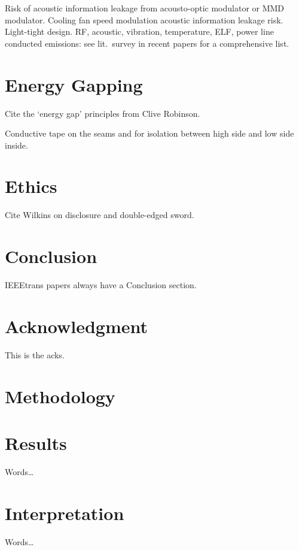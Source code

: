 \documentclass[conference]{IEEEtran}
\begin{document}
Risk of acoustic information leakage from acousto-optic modulator or MMD
modulator. Cooling fan speed modulation acoustic information leakage risk.
Light-tight design. RF, acoustic, vibration, temperature, ELF, power line
conducted emissions: see lit.\ survey in recent papers for a comprehensive
list.

\section{Energy Gapping}

Cite the `energy gap' principles from Clive Robinson.

Conductive tape on the seams and for isolation between high side and low side
inside.

\section{Ethics}

Cite Wilkins on disclosure and double-edged sword.


\section{Conclusion}

IEEEtrans papers always have a Conclusion section.

\section*{Acknowledgment}

This is the acks.

\section{Methodology}

\section{Results}

Words\ldots

\section{Interpretation}

Words\ldots
\end{document}
